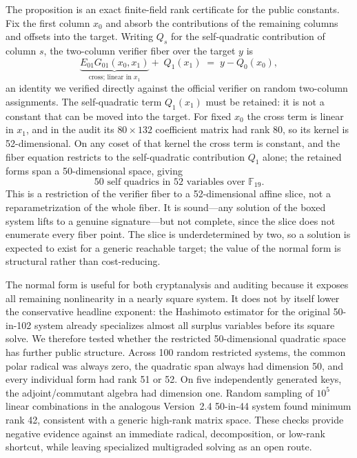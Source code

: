 \documentclass[11pt]{article}
\newcommand{\F}{\mathbb F}
\begin{document}
The proposition is an exact finite-field rank certificate for the public constants.  Fix the first column $x_0$ and absorb the contributions of the remaining columns and offsets into the target.  Writing $Q_s$ for the self-quadratic contribution of column $s$, the two-column verifier fiber over the target $y$ is
\[
 \underbrace{E_{01}G_{01}(x_0,x_1)}_{\text{cross; linear in }x_1}+\;Q_1(x_1)\;=\;y-Q_0(x_0),
\]
an identity we verified directly against the official verifier on random two-column assignments.  The self-quadratic term $Q_1(x_1)$ must be retained: it is not a constant that can be moved into the target.  For fixed $x_0$ the cross term is linear in $x_1$, and in the audit its $80\times132$ coefficient matrix had rank 80, so its kernel is 52-dimensional.  On any coset of that kernel the cross term is constant, and the fiber equation restricts to the self-quadratic contribution $Q_1$ alone; the retained forms span a 50-dimensional space, giving
\[
 \boxed{50\text{ self quadrics in }52\text{ variables over }\F_{19}.}
\]
This is a restriction of the verifier fiber to a 52-dimensional affine slice, not a reparametrization of the whole fiber.  It is sound---any solution of the boxed system lifts to a genuine signature---but not complete, since the slice does not enumerate every fiber point.  The slice is underdetermined by two, so a solution is expected to exist for a generic reachable target; the value of the normal form is structural rather than cost-reducing.

The normal form is useful for both cryptanalysis and auditing because it exposes all remaining nonlinearity in a nearly square system.  It does not by itself lower the conservative headline exponent: the Hashimoto estimator for the original 50-in-102 system already specializes almost all surplus variables before its square solve.  We therefore tested whether the restricted 50-dimensional quadratic space has further public structure.  Across 100 random restricted systems, the common polar radical was always zero, the quadratic span always had dimension 50, and every individual form had rank 51 or 52.  On five independently generated keys, the adjoint/commutant algebra had dimension one.  Random sampling of $10^5$ linear combinations in the analogous Version~2.4 50-in-44 system found minimum rank 42, consistent with a generic high-rank matrix space.  These checks provide negative evidence against an immediate radical, decomposition, or low-rank shortcut, while leaving specialized multigraded solving as an open route.
\end{document}

